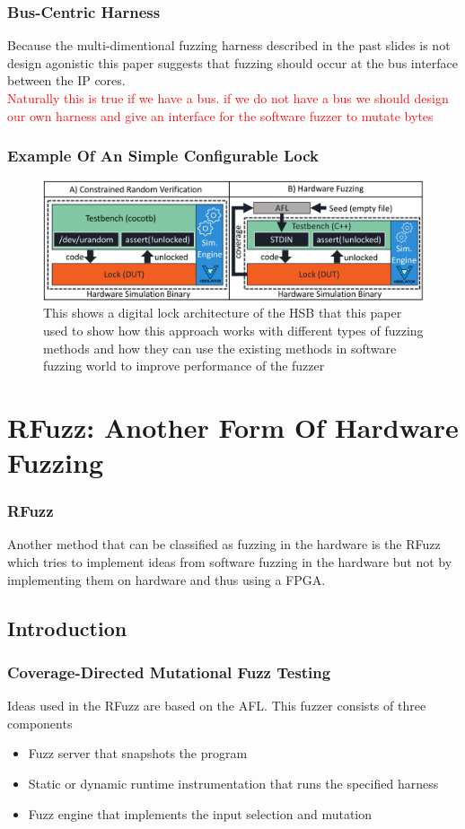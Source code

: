 \documentclass{beamer}
\begin{document}
\begin{frame}
    \frametitle{Bus-Centric Harness}
    Because the multi-dimentional fuzzing harness described in the past slides
    is not design agonistic this paper suggests that fuzzing should occur at
    the bus interface between the IP cores. \\
    \textcolor{red}{Naturally this is true if we have a bus. if we do not have
    a bus we should design our own harness and give an interface for the
    software fuzzer to mutate bytes}
\end{frame}

\begin{frame}
    \frametitle{Example Of An Simple Configurable Lock}
    \begin{figure}
        \centering
        \includegraphics[width=1.0\textwidth]{lock.png}
        \caption{This shows a digital lock architecture of the HSB that this
        paper used to show how this approach works with different types of 
        fuzzing methods and how they can use the existing methods in software
        fuzzing world to improve performance of the fuzzer}
        \label{fig:lock}
    \end{figure}
\end{frame}

\section{RFuzz: Another Form Of Hardware Fuzzing}
\begin{frame}
    \frametitle{RFuzz}
    Another method that can be classified as fuzzing in the hardware is the
    RFuzz which tries to implement ideas from software fuzzing in the hardware
    but not by implementing them on hardware and thus using a FPGA.
\end{frame}

\subsection{Introduction}
\begin{frame}
    \frametitle{Coverage-Directed Mutational Fuzz Testing}
    Ideas used in the RFuzz are based on the AFL. This fuzzer consists of three
    components
    \begin{itemize}
        \item Fuzz server that snapshots the program
        \item Static or dynamic runtime instrumentation that runs the specified
            harness
        \item Fuzz engine that implements the input selection and mutation
    \end{itemize}
\end{frame}
\end{document}
